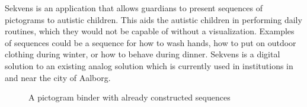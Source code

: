 Sekvens is an application that allows guardians to present sequences of pictograms to autistic children. This aids the autistic children in performing daily routines, which they would not be capable of without a visualization. Examples of sequences could be a sequence for how to wash hands, how to put on outdoor clothing during winter, or how to behave during dinner. Sekvens is a digital solution to an existing analog solution which is currently used in institutions in and near the city of Aalborg.

\begin{figure} [h!]
\centering
\begin{minipage}{.7\textwidth}
\centering
{}
\caption{A pictogram binder with already constructed sequences}
\label{fig:pictogram_binder}

\end{minipage}
\end{figure}
